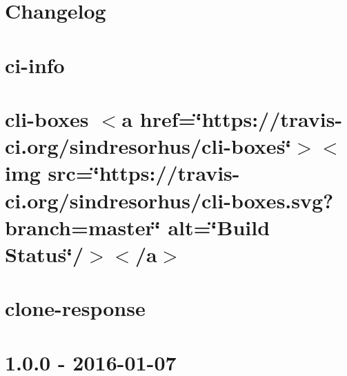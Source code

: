 \let\mypdfximage\pdfximage\def\pdfximage{\immediate\mypdfximage}\documentclass[twoside]{book}
\newcommand{\+}{\discretionary{\mbox{\scriptsize$\hookleftarrow$}}{}{}}
\begin{document}
\chapter{Changelog}
\label{md__c_1__git_hub__p_r_o_y_e_c_t_o-_i_i_i-_g_o_t_rest-api-node-mysql_node_modules_ci-info__c_h_a_n_g_e_l_o_g}

\chapter{ci-\/info}
\label{md__c_1__git_hub__p_r_o_y_e_c_t_o-_i_i_i-_g_o_t_rest-api-node-mysql_node_modules_ci-info__r_e_a_d_m_e}

\chapter{cli-\/boxes $<$a href=\char`\"{}https\+://travis-\/ci.\+org/sindresorhus/cli-\/boxes\char`\"{}$>$$<$img src=\char`\"{}https\+://travis-\/ci.\+org/sindresorhus/cli-\/boxes.\+svg?branch=master\char`\"{} alt=\char`\"{}\+Build Status\char`\"{}/$>$$<$/a$>$}
\label{md__c_1__git_hub__p_r_o_y_e_c_t_o-_i_i_i-_g_o_t_rest-api-node-mysql_node_modules_cli-boxes_readme}

\chapter{clone-\/response}
\label{md__c_1__git_hub__p_r_o_y_e_c_t_o-_i_i_i-_g_o_t_rest-api-node-mysql_node_modules_clone-response__r_e_a_d_m_e}

\chapter{1.0.0 -\/ 2016-\/01-\/07}
\label{md__c_1__git_hub__p_r_o_y_e_c_t_o-_i_i_i-_g_o_t_rest-api-node-mysql_node_modules_color-convert__c_h_a_n_g_e_l_o_g}

\end{document}
